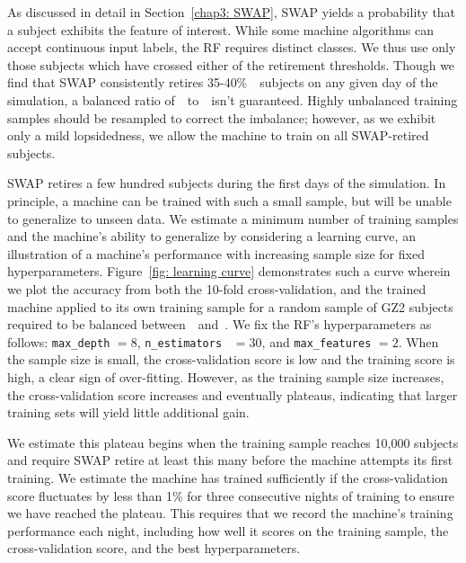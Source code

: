 As discussed in detail in Section~\ref{chap3: SWAP}, SWAP yields a probability that 
a subject exhibits the feature of interest. While some machine algorithms can 
accept continuous input labels, the RF requires distinct classes. We thus use only those subjects which have crossed either of the retirement thresholds. 
Though we find that SWAP consistently retires 35-40\%~\feat~subjects on 
any given day of the simulation, a balanced ratio of~\feat~to~\notfeat~isn't guaranteed. Highly unbalanced training samples should be resampled to correct the imbalance; however, as we exhibit only a mild lopsidedness, we allow the machine to train on all SWAP-retired subjects.  

SWAP retires a few hundred subjects during the first days of the simulation.
In principle, a machine can be trained with such a small sample, but will be unable to generalize to unseen data. We estimate a minimum number of training samples and the machine's ability to generalize by considering a learning curve, an illustration of a machine's performance with increasing sample size for fixed hyperparameters. 
Figure~\ref{fig: learning curve} demonstrates such a curve wherein we plot
the accuracy from both the 10-fold cross-validation, and the trained machine
applied to its own training sample for a random sample of GZ2 subjects
required to be balanced between~\feat~and~\notfeat.  
We fix the RF's hyperparameters as follows: \texttt{max\_depth} $=8$, 
\texttt{n\_estimators } $=30$, and \texttt{max\_features} $=2$. 
When the sample size is small, the cross-validation score is low and the training 
score is high, a clear sign of over-fitting.  However, as the training 
sample size increases, the cross-validation score increases and eventually plateaus,
 indicating that larger training sets will yield little additional gain. 

We estimate this plateau begins when the training 
sample reaches 10,000 subjects and require SWAP retire at least this many 
 before the machine attempts its first training.  We estimate the machine 
has trained sufficiently if the cross-validation score fluctuates by less than 1\% 
for three consecutive nights of training to ensure we have reached the plateau.  
This requires that we record the machine's training performance each night, 
including how well it scores on the training sample, the 
cross-validation score, and the best hyperparameters. 



